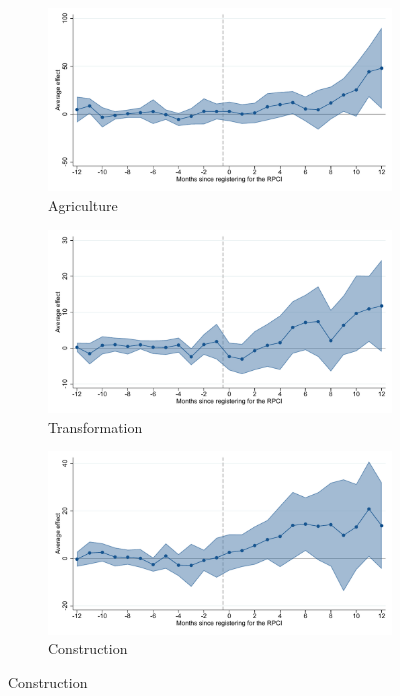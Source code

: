 \begin{figure}[H]
    \begin{subfigure}{0.32\textwidth}
    \caption{Agriculture}
    \includegraphics[width=\textwidth]{04_Figures/muestra_10porciento/event_study_sal_cierre_ind_agricul_dcdh_connected.pdf}
    \end{subfigure}
    \begin{subfigure}{0.32\textwidth}
    \caption{Transformation}
    \includegraphics[width=\textwidth]{04_Figures/muestra_10porciento/event_study_sal_cierre_ind_transf_dcdh_connected.pdf}
    \end{subfigure}
    \begin{subfigure}{0.32\textwidth}
    \caption{Construction}
    \includegraphics[width=\textwidth]{04_Figures/muestra_10porciento/event_study_sal_cierre_ind_constr_dcdh_connected.pdf}
    \end{subfigure}


\end{figure}
